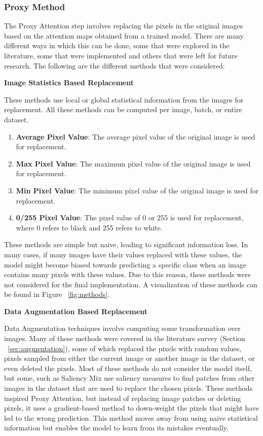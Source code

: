 \subsubsection{Proxy Method}
The Proxy Attention step involves replacing the pixels in the original images based on the attention maps obtained from a trained model. There are many different ways in which this can be done, some that were explored in the literature, some that were implemented and others that were left for future research. The following are the different methods that were considered:

\textbf{Image Statistics Based Replacement}

These methods use local or global statistical information from the images for replacement. All these methods can be computed per image, batch, or entire dataset.

\begin{enumerate}
    \item \textbf{Average Pixel Value}: The average pixel value of the original image is used for replacement.
    \item \textbf{Max Pixel Value}: The maximum pixel value of the original image is used for replacement.
    \item \textbf{Min Pixel Value}: The minimum pixel value of the original image is used for replacement.
    \item \textbf{0/255 Pixel Value}: The pixel value of 0 or 255 is used for replacement, where 0 refers to black and 255 refers to white.
\end{enumerate}
These methods are simple but naive, leading to significant information loss. In many cases, if many images have their values replaced with these values, the model might become biased towards predicting a specific class when an image contains many pixels with these values.
Due to this reason, these methods were not considered for the final implementation. A visualization of these methods can be found in Figure ~\ref{fig:methods}.

\textbf{Data Augmentation Based Replacement}

Data Augmentation techniques involve computing some transformation over images. Many of these methods were covered in the literature survey (Section ~\ref{sec:augmentation}), some of which replaced the pixels with random values, pixels sampled from either the current image or another image in the dataset, or even deleted the pixels. Most of these methods do not consider the model itself, but some, such as Saliency Mix \cite{uddinSaliencyMixSaliencyGuided2021} use saliency measures to find patches from other images in the dataset that are used to replace the chosen pixels.
These methods inspired Proxy Attention, but instead of replacing image patches or deleting pixels, it uses a gradient-based method to down-weight the pixels that might have led to the wrong prediction. This method moves away from using naive statistical information but enables the model to learn from its mistakes eventually.


